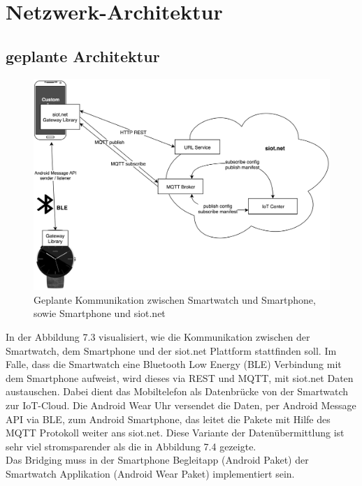\section{Netzwerk-Architektur}
\subsection{geplante Architektur}
\begin{figure}[h]
  \centering
  \includegraphics[scale=0.15]{98_Bilder/07_Architektur/01_Architektur}
  \caption[Geplante Netzwerk-Architektur mit BLE/ohne WLAN]{Geplante Kommunikation zwischen Smartwatch und Smartphone, sowie Smartphone und siot.net}
\end{figure}
In der Abbildung 7.3 visualisiert, wie die Kommunikation zwischen der Smartwatch, dem Smartphone und der siot.net Plattform stattfinden soll. Im Falle, dass die Smartwatch eine Bluetooth Low Energy (BLE) Verbindung mit dem Smartphone aufweist, wird dieses via REST und MQTT, mit siot.net Daten austauschen. Dabei dient das Mobiltelefon als Datenbrücke von der Smartwatch zur IoT-Cloud. Die Android Wear Uhr versendet die Daten, per Android Message API via BLE, zum Android Smartphone, das leitet die Pakete mit Hilfe des MQTT Protokoll weiter ans siot.net. Diese Variante der Datenübermittlung ist sehr viel stromsparender als die in Abbildung 7.4 gezeigte.\\
Das Bridging muss in der Smartphone Begleitapp (Android Paket) der Smartwatch Applikation (Android Wear Paket) implementiert sein.
\newpage
